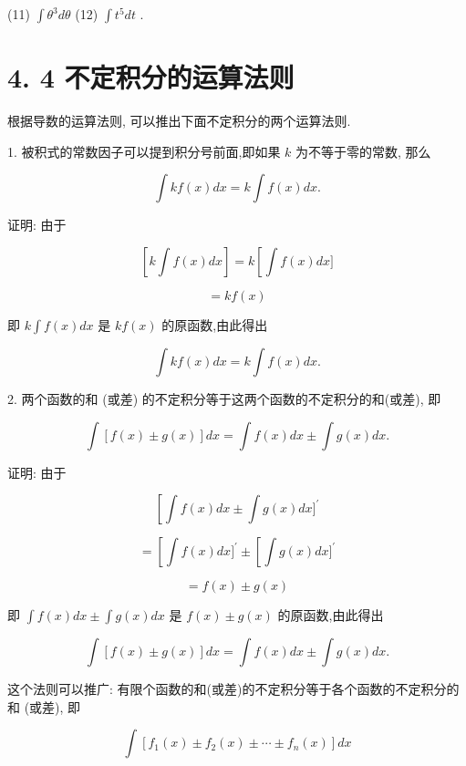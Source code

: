 \documentclass[10pt]{article}
\begin{document}
(11) \(\int {\theta }^{3}{d\theta }\) (12) \(\int {t}^{5}{dt}\) .

\section*{4. 4 不定积分的运算法则}

根据导数的运算法则, 可以推出下面不定积分的两个运算法则.

1. 被积式的常数因子可以提到积分号前面,即如果 \(k\) 为不等于零的常数, 那么

\[
\int {kf}\left( x\right) {dx} = k\int f\left( x\right) {dx}.
\]

证明: 由于

\[
\left\lbrack {k\int f\left( x\right) {dx}}\right\rbrack = k\left\lbrack {\int f\left( x\right) {dx}\rbrack }\right.
\]

\[
= {kf}\left( x\right)
\]

即 \(k\int f\left( x\right) {dx}\) 是 \({kf}\left( x\right)\) 的原函数,由此得出

\[
\int {kf}\left( x\right) {dx} = k\int f\left( x\right) {dx}.
\]

2. 两个函数的和 (或差) 的不定积分等于这两个函数的不定积分的和(或差), 即

\[
\int \left\lbrack {f\left( x\right) \pm g\left( x\right) }\right\rbrack {dx} = \int f\left( x\right) {dx} \pm \int g\left( x\right) {dx}.
\]

证明: 由于

\[
\left\lbrack {\int f\left( x\right) {dx} \pm \int g\left( x\right) {dx}{\rbrack }^{\prime }}\right.
\]

\[
= \left\lbrack {\int f\left( x\right) {dx}{\rbrack }^{\prime } \pm \left\lbrack {\int g\left( x\right) {dx}{\rbrack }^{\prime }}\right. }\right.
\]

\[
= f\left( x\right) \pm g\left( x\right)
\]

即 \(\int f\left( x\right) {dx} \pm \int g\left( x\right) {dx}\) 是 \(f\left( x\right) \pm g\left( x\right)\) 的原函数,由此得出

\[
\int \left\lbrack {f\left( x\right) \pm g\left( x\right) }\right\rbrack {dx} = \int f\left( x\right) {dx} \pm \int g\left( x\right) {dx}.
\]

这个法则可以推广: 有限个函数的和(或差)的不定积分等于各个函数的不定积分的和 (或差), 即

\[
\int \left\lbrack {{f}_{1}\left( x\right) \pm {f}_{2}\left( x\right) \pm \cdots \pm {f}_{n}\left( x\right) }\right\rbrack {dx}
\]
\end{document}
